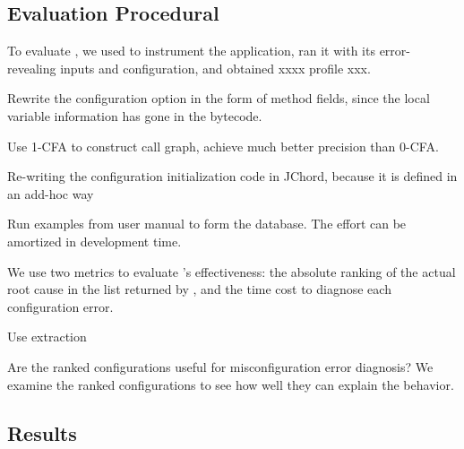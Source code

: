 \subsection{Evaluation Procedural}


To evaluate \ourtool, we used \ourtool to instrument
the application, ran it with its error-revealing
inputs and configuration, and obtained xxxx profile xxx. 

Rewrite the configuration option in the form of method fields, since
the local variable information has gone in the bytecode.

Use 1-CFA to construct call graph, achieve much better precision
than 0-CFA. 

Re-writing the configuration initialization code in JChord, because
it is defined in an add-hoc way

Run examples from user manual to form the database. The effort
can be amortized in development time.

We use two metrics to evaluate \ourtool's effectiveness: the absolute ranking of the
actual root cause in the list returned by \ourtool, and the
time cost to diagnose each configuration error.

Use extraction~\cite{Rabkin:2011:SEP}

Are the ranked configurations useful for misconfiguration
error diagnosis?  We examine the ranked configurations to see how well they can explain the behavior.


\subsection{Results}

